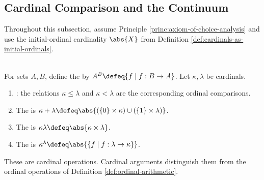 \subsection{Cardinal Comparison and the Continuum}

Throughout this subsection, assume Principle \ref{princ:axiom-of-choice-analysis} and use the initial-ordinal cardinality $\abs{X}$ from Definition \ref{def:cardinals-as-initial-ordinals}.

\begin{definition} \label{def:cardinal-comparison-and-arithmetic} \\
For sets $A,B$, define the  by $A^B\defeq\{f\mid f:B\to A\}$. Let $\kappa,\lambda$ be cardinals.
\begin{enumerate}[label=(\roman*)]
\setlength{\itemsep}{0pt}
\item {}: the relations $\kappa\leq\lambda$ and $\kappa<\lambda$ are the corresponding ordinal comparisons.
\item The  is $\kappa+\lambda\defeq\abs{(\{0\}\times\kappa)\cup(\{1\}\times\lambda)}$.
\item The  is $\kappa\lambda\defeq\abs{\kappa\times\lambda}$.
\item The  is $\kappa^\lambda\defeq\abs{\{f\mid f:\lambda\to\kappa\}}$.
\end{enumerate}
These are cardinal operations. Cardinal arguments distinguish them from the ordinal operations of Definition \ref{def:ordinal-arithmetic}.
\end{definition}

